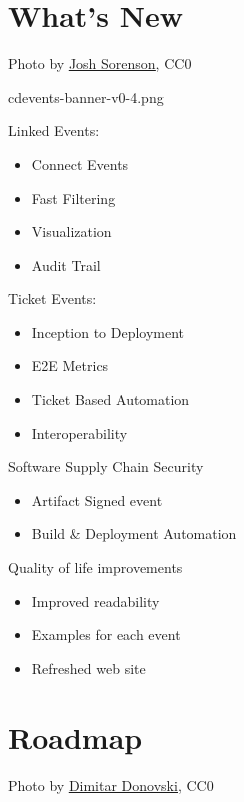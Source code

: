 \documentclass[aspectratio=169,11pt,hyperref={colorlinks=true}]{beamer}
\begin{document}
\section{What's New}
\begin{sectionwithpiclargecentral}{Photo by \href{https://unsplash.com/@joshsorenson}{\underline{Josh Sorenson}}, CC0}
\end{sectionwithpiclargecentral}

\begin{tpicstripedframe}%
  {cdevents-banner-v0-4.png}
  {%
  Linked Events:
  \begin{itemize}
    \item Connect Events
    \item Fast Filtering
    \item Visualization
    \item Audit Trail
  \end{itemize}
  }%
  {%
  Ticket Events:
  \begin{itemize}
    \item Inception to Deployment
    \item E2E Metrics
    \item Ticket Based Automation
    \item Interoperability
  \end{itemize}
  }%
  {%
  Software Supply Chain Security \\
  \vspace{0.01\textheight}
  \begin{itemize}
    \item Artifact Signed event
    \item Build \& Deployment Automation
  \end{itemize}
  }%
  {%
  Quality of life improvements
  \begin{itemize}
    \item Improved readability
    \item Examples for each event
    \item Refreshed web site
  \end{itemize}
  }%
\end{tpicstripedframe}

\section{Roadmap}
\begin{sectionwithpiclargecentral}{Photo by \href{https://unsplash.com/@dmtrdon}{\underline{Dimitar Donovski}}, CC0}
\end{sectionwithpiclargecentral}
\end{document}
